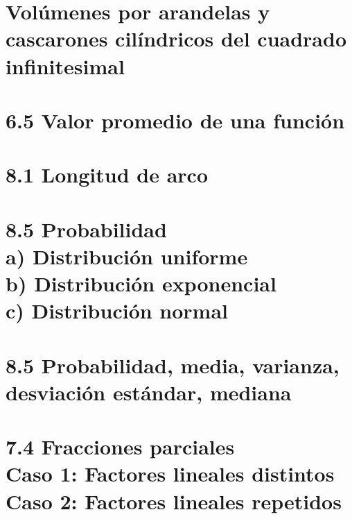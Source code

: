 \documentclass{book}
\begin{document}
\chapter{Volúmenes por arandelas y cascarones cilíndricos del cuadrado infinitesimal} 


\chapter{6.5 Valor promedio de una función } 

\chapter{8.1 Longitud de arco }  


\chapter{8.5 Probabilidad \\ a) Distribución uniforme \\ b) Distribución exponencial \\ c) Distribución normal } 


\chapter{8.5 Probabilidad, media, varianza, desviación estándar, mediana } 


\chapter{7.4 Fracciones parciales \\ Caso 1: Factores lineales distintos \\ Caso 2: Factores lineales repetidos } 

\end{document}
